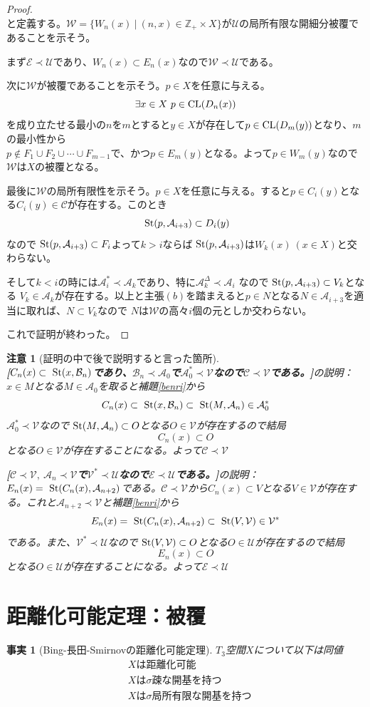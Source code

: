 \documentclass[leqno]{jsarticle}
\newtheorem{fact}[thm]{事実}
\newtheorem*{cau}{注意}
\newcommand{\zz}{\mathbb{Z}}
\newcommand{\cl}{\text{{\rm CL}} }
\newcommand{\s}{\text{  {\rm St}} }
\newcommand{\uu}{\mathcal{U}}
\newcommand{\vv}{\mathcal{V}}
\newcommand{\A}{\mathcal{A}}
\newcommand{\B}{\mathcal{B}}
\newcommand{\C}{\mathcal{C}}
\newcommand{\E}{\mathcal{E}}
\newcommand{\dd}{\Delta}
\newcommand{\pr}{\prec}
\newcommand{\zp}{\zz_{+}}
\begin{document}
\begin{proof}
\[\]
と定義する。$\mathcal{W}=\{W_n(x)\ |\ (n,x)\in \zp\times X\}$が$\uu$の局所有限な開細分被覆であることを示そう。\par
まず$\mathcal{E}\pr \uu$であり、$W_n(x)\subset E_n(x)$なので$\mathcal{W}\pr \uu$である。\par
次に$\mathcal{W}$が被覆であることを示そう。$p\in X$を任意に与える。
\[
\exists x\in X\ p\in \cl(D_n(x))
\]
を成り立たせる最小の$n$を$m$とすると$y\in X$が存在して$p\in \cl(D_m(y))$となり、$m$の最小性から\\
$p\not\in F_1\cup F_2\cup\cdots \cup F_{m-1}$で、かつ$p\in E_m(y)$となる。よって$p\in W_m(y)$なので$\mathcal{W}$は$X$の被覆となる。\par
最後に$\mathcal{W}$の局所有限性を示そう。$p\in X$を任意に与える。すると$p\in C_i(y)$となる$C_i(y)\in \C$が存在する。このとき
\[
\s(p,\A_{i+3})\subset D_i(y)
\]
なので$\s(p,\A_{i+3})\subset F_i$よって$k>i$ならば$\s(p,\A_{i+3})$は$W_k(x)\ (x\in X)$と交わらない。\par
そして$k< i$の時には$\A_i^{*}\pr \A_k$であり、特に$\A_k^{\dd}\pr \A_i$
なので$\s(p,\A_{i+3})\subset V_{k}$となる
$V_k\in \A_{k}$が存在する。以上と主張$(b)$を踏まえると$p\in N$となる$N\in \A_{i+3}$を適当に取れば、$N\subset V_k$なので
$N$は$\mathcal{W}$の高々$i$個の元としか交わらない。\par
これで証明が終わった。
\end{proof}
\begin{cau}[証明の中で後で説明すると言った箇所]${}$\\
{\bf [$C_n(x)\subset \s(x,\B_{n})$であり、$\B_n\pr \A_0$で$\A_0^{*}\pr \vv$なので$\C\pr\vv$である。]}の説明：$x\in M$となる$M\in \A_0$を取ると補題\ref{benri}から
\[
C_n(x)\subset \s(x,\B_{n})\subset \s(M,\A_n)\in \A_0^{*}
\]
$\A_0^{*}\pr\vv$なので$\s(M,\A_n)\subset O$となる$O\in \vv$が存在するので結局
\[
C_n(x)\subset O
\]
となる$O\in \vv$が存在することになる。よって$\C\pr \vv$


{\bf [$\C\pr \vv,\ \A_n\pr \vv$で$\vv^{*}\pr\uu$なので$\mathcal{E}\pr \uu$である。]}の説明：
$E_n(x)=\s(C_n(x),\A_{n+2})$である。$\C\pr \vv$から$C_n(x)\subset V$となる$V\in \vv$が存在する。これと$\A_{n+2}\pr \vv$と補題\ref{benri}から
\[
E_n(x)=\s(C_n(x),\A_{n+2})\subset \s(V,\vv)\in \vv^{*}
\]
である。また、$\vv^{*}\pr \uu$なので$\s(V,\vv)\subset O$となる$O\in \uu$が存在するので結局
\[
E_n(x)\subset O
\]
となる$O\in \uu$が存在することになる。よって$\E\pr \uu$
\end{cau}



\section*{距離化可能定理：被覆}
\begin{fact}[Bing-長田-Smirnovの距離化可能定理]\label{BNS}
$T_3$空間$X$について以下は同値
\begin{align}
&\mbox{$X$は距離化可能}\\
&\mbox{$X$は$\sigma$疎な開基を持つ}\\
&\mbox{$X$は$\sigma$局所有限な開基を持つ}
\end{align}
\end{fact}
\end{document}
